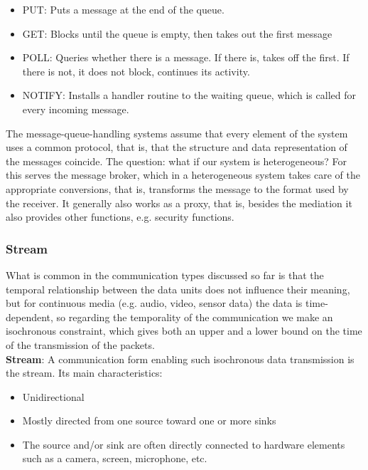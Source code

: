 \documentclass[margin=0px]{article}
\begin{document}
\begin{itemize}
    \item	PUT: Puts a message at the end of the queue.
    \item	GET: Blocks until the queue is empty, then takes out the first message
    \item	POLL: Queries whether there is a message. If there is, takes off the first.
          If there is not, it does not block, continues its activity.
    \item	NOTIFY: Installs a handler routine to the waiting queue, which is called for every
          incoming message.
\end{itemize}

The message-queue-handling systems assume that every element of the system uses a common protocol, that is, that the structure
and data representation of the messages coincide. The question: what if our system is heterogeneous? For this serves
the message broker, which in a heterogeneous system takes care of the appropriate conversions, that is,
transforms the message to the format used by the receiver. It generally also works as a proxy, that is, besides the mediation
it also provides other functions, e.g. security functions.

\subsubsection{Stream}

What is common in the communication types discussed so far is that the temporal relationship between the data units does not influence
their meaning, but for continuous media (e.g. audio, video, sensor data) the data is time-dependent, so regarding the
temporality of the communication we make an isochronous constraint, which gives both an upper and a lower bound
on the time of the transmission of the packets.\\

\noindent \textbf{Stream}: A communication form enabling such isochronous data transmission is the stream. Its main characteristics:
\begin{itemize}
    \item	Unidirectional
    \item	Mostly directed from one source toward one or more sinks
    \item	The source and/or sink are often directly connected to hardware elements such as a camera, screen,
          microphone, etc.
\end{itemize}
\end{document}
